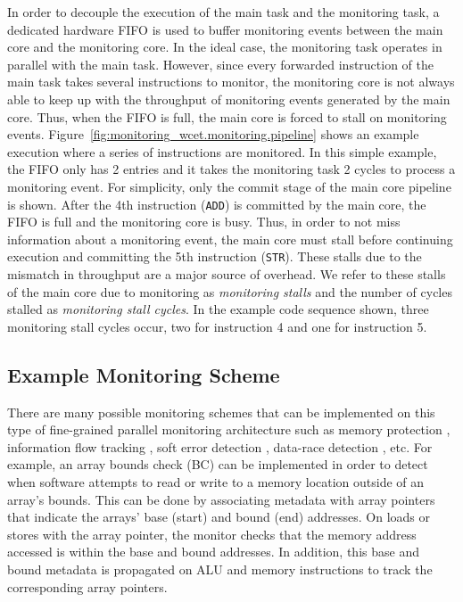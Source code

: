 In order to decouple the execution of the main task and the monitoring task, a
dedicated hardware FIFO is used to buffer monitoring events between the main
core and the monitoring core.  In the ideal case, the monitoring task operates
in parallel with the main task.  However, since 
every forwarded instruction of the main task
takes several instructions to monitor, the monitoring core is not always able to keep
up with the throughput of monitoring events generated by the main core.  Thus,
when the FIFO is full, the main core is forced to stall on monitoring events.
Figure~\ref{fig:monitoring_wcet.monitoring.pipeline} shows an example
execution where a series of instructions are monitored. In this simple example,
the FIFO only has 2 entries and it takes the monitoring task 2 cycles to
process a monitoring event. For simplicity, only the commit stage of the main
core pipeline is shown.  After the 4th instruction ({\tt ADD}) is committed by
the main core, the FIFO is full and the monitoring core is busy. Thus, in order
to not miss information about a monitoring event, the main core must stall
before continuing execution and committing the 5th instruction ({\tt STR}).
These stalls due to the mismatch in throughput are a major source of overhead.
We refer to these stalls of the main core due to monitoring as \emph{monitoring
stalls} and the number of cycles stalled as \emph{monitoring stall cycles}. In
the example code sequence shown, three monitoring stall cycles occur, two for
instruction 4 and one for instruction 5.

\subsection{Example Monitoring Scheme}
\label{sec:monitoring_wcet.monitoring.example}

There are many possible monitoring schemes that can be implemented on this type
of fine-grained parallel monitoring architecture such as memory protection
\cite{mondrian-asplos02}, information flow tracking \cite{dift-asplos04,
testudo-micro08}, soft error detection \cite{argus-micro07}, data-race
detection \cite{cord-hpca06, eraser-tocs97, literace-pldi09, pacer-pldi10},
etc.  For example, an array bounds check (BC) \cite{hardbound-asplos08} can be
implemented in order to detect when software attempts to read or write to a
memory location outside of an array's bounds. This can be done by associating
metadata with array pointers that indicate the arrays' base (start) and bound
(end) addresses. On loads or stores with the array pointer, the monitor checks
that the memory address accessed is within the base and bound addresses. In
addition, this base and bound metadata is propagated on ALU and memory
instructions to track the corresponding array pointers.

